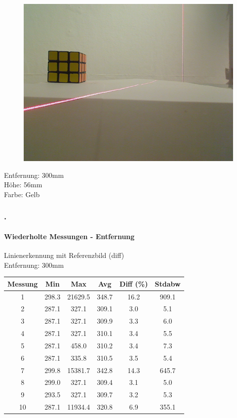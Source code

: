 \documentclass[xcolor=dvipsnames]{beamer}
\def\frametitlesec{\frametitle{\arabic{section}.\hspace{0.5ex}\insertsection}}
\def\framesubtitles#1{\framesubtitle{\hspace{3.5ex}#1}}
\begin{document}
\begin{frame}
\begin{figure}
\begin{minipage}{0.32\linewidth}
		\end{minipage}
		\hfill
		\begin{minipage}{0.32\linewidth}
			\includegraphics[width=\linewidth]{includes/test_repeat_3}
		\end{minipage}
	\end{figure}
	
	Entfernung: 300mm\\
	Höhe: 56mm\\
	Farbe: Gelb

\end{frame}


\begin{frame}
	\frametitlesec
	\framesubtitles{Wiederholte Messungen - Entfernung}

	Linienerkennung mit Referenzbild (diff)\\
	Entfernung: 300mm
	\vfill

	\begin{tabular}{c|c|c|c|c|c}
		Messung & Min & Max & Avg & Diff (\%) & Stdabw \\ \hline
		1 & 298.3 & 21629.5 & 348.7 & 16.2 & 909.1 \\
		2 & 287.1 & 327.1 & 309.1 & 3.0 & 5.1 \\
		3 & 287.1 & 327.1 & 309.9 & 3.3 & 6.0 \\
		4 & 287.1 & 327.1 & 310.1 & 3.4 & 5.5 \\
		5 & 287.1 & 458.0 & 310.2 & 3.4 & 7.3 \\
		6 & 287.1 & 335.8 & 310.5 & 3.5 & 5.4 \\
		7 & 299.8 & 15381.7 & 342.8 & 14.3 & 645.7 \\
		8 & 299.0 & 327.1 & 309.4 & 3.1 & 5.0 \\
		9 & 293.5 & 327.1 & 309.7 & 3.2 & 5.3 \\
		10 & 287.1 & 11934.4 & 320.8 & 6.9 & 355.1
	\end{tabular}

\end{frame}
\end{document}
